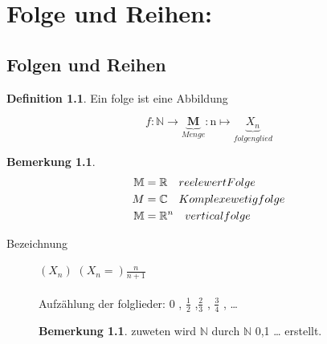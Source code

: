 \documentclass[a4paper,12pt,leqno]{report}
\theoremstyle{plain} %
\theoremstyle{definition} %
\newtheorem{remark}[theorem]{Bemerkung}
\newtheorem{definition}[theorem]{Definition}
\begin{document}
    \chapter{Folge und Reihen:}
    \section{Folgen und Reihen}
    \begin{definition}
        Ein folge ist eine Abbildung

        \[ f: \mathbb{N} \rightarrow \underbrace{\mathbf{M}}_{Menge} : \mathrm{n} \mapsto \underbrace{X_n}_{folgenglied} \]

    \end{definition}
    \begin{remark}

        \begin{align}	\mathbb{M} &= \mathbb{R} \quad reelewert Folge  \notag \\
        M&= \mathbb{C} \quad	 Komplexewetig folge  \notag \\
        \mathbb{M}&= \mathbb{R}^n \quad vertical folge \notag
        \end{align}




    \end{remark}
    \begin{description}

        \item[Bezeichnung]

        \quad $(X_n)$ \space {} \space $ \left( X_n =  \right) \frac{n}{n+1} $
        \\ \\ Aufzählung der folglieder: 0 , $\frac{1}{2}$ ,$\frac{2}{3}$ , $\frac{3}{4}$ , \dots
        \begin{remark}
            zuweten wird $\mathbb{N}$ durch $\mathbb{N}$ {0,1 \dots} erstellt.


        \end{remark}
    \end{description}
\end{document}
